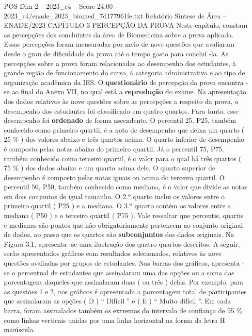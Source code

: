 \begin{textsample}{POS Dim 2 – 2023\_c4 – Score 24.00 – 2023\_c4/enade\_2023\_biomed\_7d177961fe.txt}  \label{ex:f2_pos_012}
Relatório Síntese de Área – ENADE/2023 CAPÍTULO 3 PERCEPÇÃO DA PROVA Neste capítulo, constam as percepções dos concluintes da área de Biomedicina sobre a prova aplicada.
Essas percepções foram mensuradas por meio de nove questões que avaliaram desde o grau de dificuldade da prova até o tempo gasto para concluí -la.
As percepções sobre a prova foram relacionadas ao desempenho dos estudantes, à grande região de funcionamento do curso, à categoria administrativa e ao tipo de organização acadêmica da IES.
O \textbf{questionário} de percepção da prova encontra -se ao final do Anexo VII, no qual está a \textbf{reprodução} do exame.
Na apresentação dos dados relativos às nove questões sobre as percepções a respeito da prova, o desempenho dos estudantes foi classificado em quatro quartos.
Para tanto, esse desempenho foi \textbf{ordenado} de forma ascendente.
O percentil 25, P25, também conhecido como primeiro quartil, é a nota de desempenho que deixa um quarto ( 25 \% ) dos valores abaixo e três quartos acima.
O quarto inferior de desempenho é composto pelas notas abaixo do primeiro quartil.
Já o percentil 75, P75, também conhecido como terceiro quartil, é o valor para o qual há três quartos ( 75 \% ) dos dados abaixo e um quarto acima dele.
O quarto superior de desempenho é composto pelas notas iguais ou acima do terceiro quartil.
O percentil 50, P50, também conhecido como mediana, é o valor que divide as notas em dois conjuntos de igual tamanho.
O 2.º quarto inclui os valores entre o primeiro quartil ( P25 ) e a mediana.
O 3.º quarto contém os valores entre a mediana ( P50 ) e o terceiro quartil ( P75 ).
Vale ressaltar que percentis, quartis e medianas são pontos que não obrigatoriamente pertencem ao conjunto original de dados, ao passo que os quartos são \textbf{subconjuntos} dos dados originais.
Na Figura 3.1, apresenta -se uma ilustração dos quatro quartos descritos.
A seguir, serão apresentados gráficos com resultados selecionados, relativos às nove questões avaliadas por grupos de estudantes.
Nas barras dos gráficos, apresenta -se o percentual de estudantes que assinalaram uma das opções ou a soma das porcentagens daqueles que assinalaram duas ( ou três ) delas.
Por exemplo, para as questões 1 e 2, nos gráficos é apresentada a porcentagem total de participantes que assinalaram as opções ( D ) “ Difícil ” e ( E ) “ Muito difícil ”.
Em cada barra, foram assinalados também os extremos do intervalo de confiança de 95 \% como linhas verticais unidas por uma linha horizontal na forma da letra H maiúscula.

\end{textsample}
